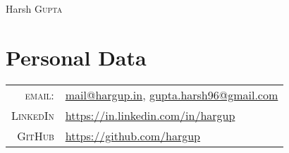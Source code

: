 \documentclass[a4paper,10pt]{article}
\begin{document}
\pagestyle{empty} %


\par{\centering
    {\Huge Harsh \textsc{Gupta}
}\bigskip\par}

\section{Personal Data}

\begin{tabular}{rl}
    \textsc{email:}     &

     \href{mailto:mail@hargup.in}{mail@hargup.in},
     \href{mailto:gupta.harsh96@gmail.com}{gupta.harsh96@gmail.com}\\
    \textsc{LinkedIn}     &
    \href{https://in.linkedin.com/in/hargup}{https://in.linkedin.com/in/hargup}\\
    \textsc{GitHub}     & \href{https://github.com/hargup}{https://github.com/hargup}
\end{tabular}

\end{document}
